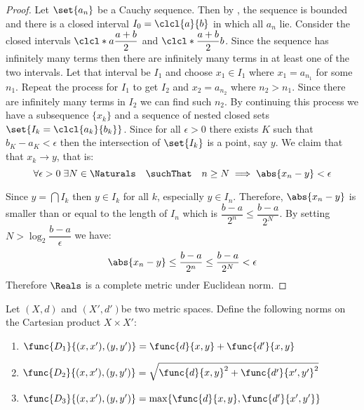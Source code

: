 \begin{proof} \label{RealComplete}
    Let \(\set{ a_n }\) be a Cauchy sequence. Then by , the sequence is bounded and there is a closed interval \(I_0 = \clcl{a}{b} \) in which all \(a_n\) lie. Consider the closed intervals \(\clcl*{a}{\dfrac{a + b}{2}} \) and \(\clcl*{\dfrac{a + b}{2}}{b}\). Since the sequence has infinitely many terms then there are infinitely many terms in at least one of the two intervals. Let that interval be \(I_1\) and choose \(x_1 \in I_1\) where \(x_1 = a_{n_1}\) for some \(n_1\).
    Repeat the process for \(I_1\) to get \(I_2 \) and \(x_2 = a_{n_2}\) where \(n_2 > n_1\). Since there are infinitely many terms in \(I_2\) we can find such \(n_2\). By continuing this process we have a subsequence \(\{ x_k \}\) and a sequence of nested closed sets \(\set{ I_k = \clcl{a_k}{b_k}}\). Since for all \(\epsilon > 0\) there exists \(K\) such that \(b_K - a_K < \epsilon\) then the intersection of \(\set{I_k}\) is a point, say \(y\). We claim that that \(x_k \to y\), that is:
    \begin{equation*}
        \forall \epsilon > 0 \; \exists N \in \Naturals \quad \suchThat \quad n \geq N \implies \abs{x_n - y} < \epsilon
    \end{equation*}

    Since \(y = \bigcap I_k\) then \(y \in I_k\) for all \(k\), especially \(y \in I_n\). Therefore, \(\abs{x_n - y}\) is smaller than or equal to the length of \(I_n\) which is \(\dfrac{b - a}{2^n} \leq \dfrac{b-a}{2^N}\). By setting \(N > \log_2{\dfrac{b-a}{\epsilon}}\) we have:
    \begin{equation*}
        \abs{x_n - y} \leq \dfrac{b - a}{2^n} \leq \dfrac{b-a}{2^N} < \epsilon
    \end{equation*}
    Therefore \(\Reals\) is a complete metric under Euclidean norm.
\end{proof}


Let \((X,d)\) and \((X',d')\)be two metric spaces. Define the following norms on the Cartesian product \(X \times X'\):
\begin{enumerate}
    \item \(\func{D_1}{(x,x'),(y,y')} = \func{d}{x,y} + \func{d'}{x,y}\)
    \item \(\func{D_2}{(x,x'),(y,y')} = \sqrt{\func{d}{x,y}^2 +\func{d'}{x',y'}^2}\)
    \item \(\func{D_3}{(x,x'),(y,y')} = \max \{ \func{d}{x,y} , \func{d'}{x',y'}\}\)
\end{enumerate}


